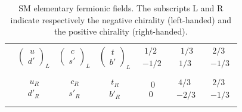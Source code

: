 \begin{table}[]
\begin{tabular}{|cccc|c|c|c|}
& $\begin{pmatrix}\ u\\ d' \end{pmatrix}_L$ & $\begin{pmatrix}\ c\\ s' \end{pmatrix}_L$ & $\begin{pmatrix}\ t\\ b' \end{pmatrix}_L$ & $\begin{matrix}\ 1/2\\ -1/2 \end{matrix}$ & $\begin{matrix}\ 1/3\\ 1/3 \end{matrix}$ & $\begin{matrix}\ 2/3\\ -1/3 \end{matrix}$ \\
                         &                     &                     &                     &                         &                     &                     \\
& $\begin{matrix}\ u_R\\ d'_R \end{matrix}$ & $\begin{matrix}\ c_R\\ s'_R \end{matrix}$ & $\begin{matrix}\ t_R\\ b'_R \end{matrix}$ & $\begin{matrix}\ 0\\ 0 \end{matrix}$ & $\begin{matrix}\ 4/3\\ -2/3 \end{matrix}$ & $\begin{matrix}\ 2/3\\ -1/3 \end{matrix}$ \\
                         &                     &                     &                     &                         &                     &                    \\\hline
\end{tabular}
\caption{SM elementary fermionic fields. The subscripts L and R indicate respectively the negative chirality (left-handed) and the positive chirality (right-handed).}
\label{tab:SMParticles}
\end{table}

